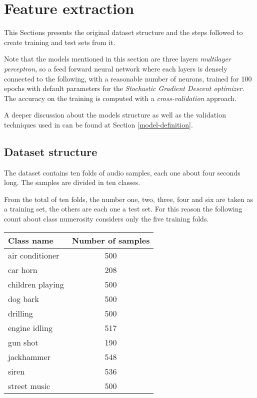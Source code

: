 \section{Feature extraction}
\label{feature-extraction}

This Sections presents the original dataset structure and the 
steps followed to create training and test sets from it.

Note that the models mentioned in this section are
three layers \emph{multilayer perceptron}, 
so a feed forward neural network where each layers 
is densely connected  to the following, 
with a reasonable number of neurons, trained 
for 100 epochs with default parameters for the \emph{Stochastic Gradient 
Descent optimizer}.~\cite{mlp}\cite{sgd}
The accuracy on the training is computed with a \emph{cross-validation} 
approach.~\cite{cross}

A deeper discussion about the models structure as well as the validation
techniques used in can be found at Section \vref{model-definition}.

\subsection{Dataset structure}
\label{dataset-structure}

The dataset contains ten folds of audio samples, each one about 
four seconds long. The samples are divided in ten classes. 

From the total of ten folds, the number one, two, three, four and six 
are taken as a training set, the others are each one a test set.
For this reason the following count about class numerosity considers
only the five training folds.

\begin{center}
    \begin{tabular}{ |l|c| } 
        \hline
        Class name & Number of samples \\
        \hline
        air conditioner & 500 \\
        car horn & 208 \\
        children playing & 500 \\
        dog bark & 500 \\
        drilling & 500 \\
        engine idling & 517 \\
        gun shot & 190 \\
        jackhammer & 548 \\
        siren & 536 \\
        street music & 500 \\
        \hline
    \end{tabular}
\end{center}

